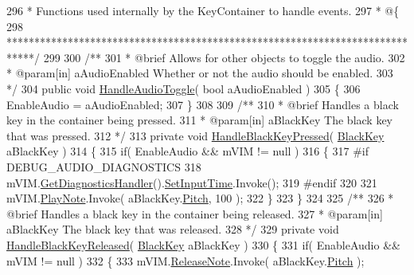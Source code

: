 \begin{DoxyCodeInclude}
296 \textcolor{comment}{    * Functions used internally by the KeyContainer to handle events.}
297 \textcolor{comment}{    * @\{}
298 \textcolor{comment}{    *****************************************************************************/}
299 \textcolor{comment}{}
300 \textcolor{comment}{    /**}
301 \textcolor{comment}{     * @brief Allows for other objects to toggle the audio.}
302 \textcolor{comment}{     * @param[in] aAudioEnabled Whether or not the audio should be enabled.}
303 \textcolor{comment}{    */}
304     \textcolor{keyword}{public} \textcolor{keywordtype}{void} \hyperlink{group___key_contain_handlers_ga5fc6752f438bda64f0f860da0788fc13}{HandleAudioToggle}( \textcolor{keywordtype}{bool} aAudioEnabled )
305     \{
306         EnableAudio = aAudioEnabled;
307     \}
308 \textcolor{comment}{}
309 \textcolor{comment}{    /**}
310 \textcolor{comment}{    * @brief Handles a black key in the container being pressed.}
311 \textcolor{comment}{    * @param[in] aBlackKey The black key that was pressed.}
312 \textcolor{comment}{    */}
313     \textcolor{keyword}{private} \textcolor{keywordtype}{void} \hyperlink{group___key_contain_handlers_ga05cc2543fd9772b26e27bf4f6247ab47}{HandleBlackKeyPressed}( \hyperlink{class_black_key}{BlackKey} aBlackKey )
314     \{
315         \textcolor{keywordflow}{if}( EnableAudio && mVIM != null )
316         \{
317 \textcolor{preprocessor}{            #if DEBUG\_AUDIO\_DIAGNOSTICS}
318                 mVIM.\hyperlink{group___v_i_m_pub_func_ga7e60bc3c5464d8f34f0d56def675bcc6}{GetDiagnosticsHandler}().\hyperlink{group___audio_testing_a133561901c2aef535b2f3c098e55b959}{SetInputTime}.Invoke();
319 \textcolor{preprocessor}{            #endif}
320 
321             mVIM.\hyperlink{group___v_i_m_events_gaa21021c13a8c9d13cbf374d5bf9d68fa}{PlayNote}.Invoke( aBlackKey.\hyperlink{group___black_key_pub_var_gad233c456182c9cef7c01486484940439}{Pitch}, 100 );
322         \}
323     \}
324 \textcolor{comment}{}
325 \textcolor{comment}{    /**}
326 \textcolor{comment}{    * @brief Handles a black key in the container being released.}
327 \textcolor{comment}{    * @param[in] aBlackKey The black key that was released.}
328 \textcolor{comment}{    */}
329     \textcolor{keyword}{private} \textcolor{keywordtype}{void} \hyperlink{group___key_contain_handlers_ga5a0c5565c5ebc6026b3122f487e51704}{HandleBlackKeyReleased}( \hyperlink{class_black_key}{BlackKey} aBlackKey )
330     \{
331         \textcolor{keywordflow}{if}( EnableAudio && mVIM != null )
332         \{
333             mVIM.\hyperlink{group___v_i_m_events_ga3a1726a6366126421434c2c7be5e5678}{ReleaseNote}.Invoke( aBlackKey.\hyperlink{group___black_key_pub_var_gad233c456182c9cef7c01486484940439}{Pitch} );

\end{DoxyCodeInclude}
